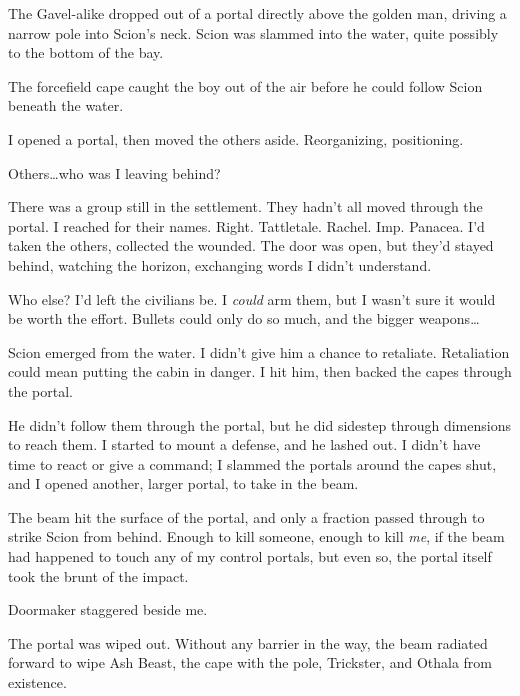 The Gavel-alike dropped out of a portal directly above the golden man, driving a narrow pole into Scion's neck.  Scion was slammed into the water, quite possibly to the bottom of the bay.



The forcefield cape caught the boy out of the air before he could follow Scion beneath the water.



I opened a portal, then moved the others aside.  Reorganizing, positioning.



Others\ldots who was I leaving behind?



There was a group still in the settlement.  They hadn't all moved through the portal.  I reached for their names.  Right.  Tattletale.  Rachel.  Imp.  Panacea.  I'd taken the others, collected the wounded.  The door was open, but they'd stayed behind, watching the horizon, exchanging words I didn't understand.



Who else?  I'd left the civilians be. I \emph{could }arm them, but I wasn't sure it would be worth the effort.  Bullets could only do so much, and the bigger weapons\ldots



Scion emerged from the water.  I didn't give him a chance to retaliate.  Retaliation could mean putting the cabin in danger.  I hit him, then backed the capes through the portal.



He didn't follow them through the portal, but he did sidestep through dimensions to reach them.  I started to mount a defense, and he lashed out.  I didn't have time to react or give a command; I slammed the portals around the capes shut, and I opened another, larger portal, to take in the beam.



The beam hit the surface of the portal, and only a fraction passed through to strike Scion from behind.  Enough to kill someone, enough to kill \emph{me}, if the beam had happened to touch any of my control portals, but even so, the portal itself took the brunt of the impact.



Doormaker staggered beside me.



The portal was wiped out.  Without any barrier in the way, the beam radiated forward to wipe Ash Beast, the cape with the pole, Trickster, and Othala from existence.



